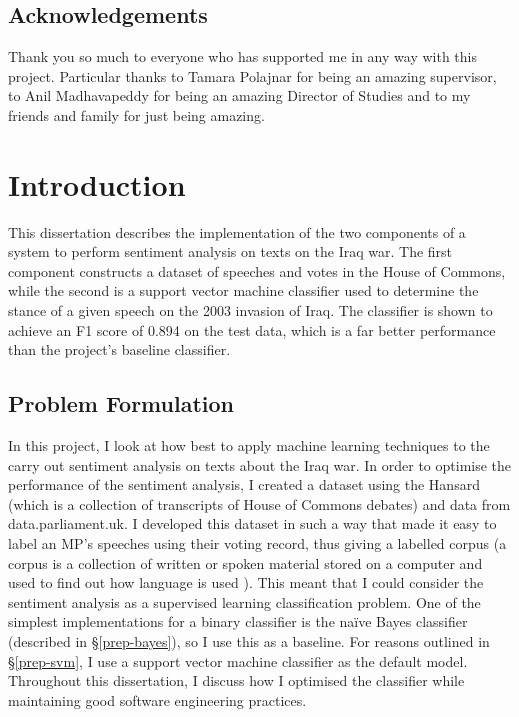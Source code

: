 \documentclass[12pt,a4paper,twoside,openright]{report}
\begin{document}
\setcounter{tocdepth}{4}
\setcounter{secnumdepth}{4}
\tableofcontents

\listoffigures

\newpage
\section*{Acknowledgements}

Thank you so much to everyone who has supported me in any way with this project. Particular thanks to Tamara Polajnar for being an amazing supervisor, to Anil Madhavapeddy for being an amazing Director of Studies and to my friends and family for just being amazing.

\pagestyle{headings}

\chapter{Introduction}

This dissertation describes the implementation of the two components of a system to perform sentiment analysis on texts on the Iraq war. The first component constructs a dataset of speeches and votes in the House of Commons, while the second is a support vector machine classifier used to determine the stance of a given speech on the 2003 invasion of Iraq. The classifier is shown to achieve an F1 score of 0.894 on the test data, which is a far better performance than the project's baseline classifier.

\section{Problem Formulation} \label{intro-challenges}

In this project, I look at how best to apply machine learning techniques to the carry out sentiment analysis on texts about the Iraq war. In order to optimise the performance of the sentiment analysis, I created a dataset using the Hansard (which is a collection of transcripts of House of Commons debates) and data from data.parliament.uk. I developed this dataset in such a way that made it easy to label an MP's speeches using their voting record, thus giving a labelled corpus (a corpus is a collection of written or spoken material stored on a computer and used to find out how language is used \cite{corpus_definition}). This meant that I could consider the sentiment analysis as a supervised learning classification problem. One of the simplest implementations for a binary classifier is the na\"{i}ve Bayes classifier (described in \S\ref{prep-bayes}), so I use this as a baseline. For reasons outlined in \S\ref{prep-svm}, I use a support vector machine classifier as the default model. Throughout this dissertation, I discuss how I optimised the classifier while maintaining good software engineering practices.
\end{document}
